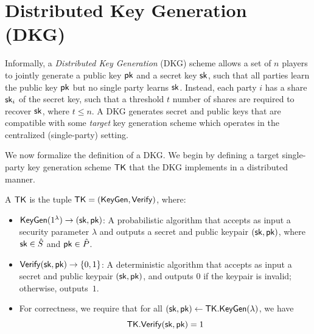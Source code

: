 \section{Distributed Key Generation (DKG)}
\label{dkg-reqs}

Informally, a \emph{Distributed Key Generation} (DKG) scheme allows a set of $n$ players to jointly generate a public key $\mathsf{pk}$ and a secret key $\mathsf{sk}$,
such that all parties learn the public key $\mathsf{pk}$ but no single party learns $\mathsf{sk}$.
Instead, each party $i$ has a share $\mathsf{sk}_i$ of the secret key,
such that a threshold $t$ number of shares are required to recover $\mathsf{sk}$,
where $t \leq n$.
A DKG generates secret and public keys that are compatible with some \emph{target} key generation scheme which operates in the centralized (single-party) setting.

We now formalize the definition of a DKG.
We begin by defining a target single-party key generation scheme $\mathsf{TK}$
that the DKG implements in a distributed manner.

\begin{definition}
A  $\mathsf{TK}$
is the tuple $\mathsf{TK} = (\mathsf{KeyGen},$\allowbreak$\mathsf{Verify})$, where:
\begin{itemize}
    \item $\mathsf{KeyGen}(1^\lambda) \rightarrow (\mathsf{sk}, \mathsf{pk})$:
      A probabilistic algorithm that
      accepts as input a security parameter $\lambda$
      and outputs a secret and public keypair $(\mathsf{sk}, \mathsf{pk})$,
      where $\mathsf{sk} \in \hat{S}$ and $\mathsf{pk} \in \hat{P}$.
    \item $\mathsf{Verify}(\mathsf{sk}, \mathsf{pk}) \rightarrow \{ 0, 1\}$:
      A deterministic algorithm that accepts as input
      a secret and public keypair $(\mathsf{sk}, \mathsf{pk})$,
      and outputs $0$ if the keypair is invalid; otherwise, outputs~$1$.
    \item For correctness, we require that for all $(\mathsf{sk}, \mathsf{pk}) \gets \mathsf{TK}.\mathsf{KeyGen}(\lambda)$, we have
      \[
        \mathsf{TK}.\mathsf{Verify}(\mathsf{sk}, \mathsf{pk}) = 1
      \]
\end{itemize}
\end{definition}



